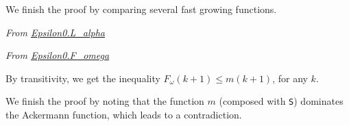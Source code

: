 We finish the proof by comparing several fast growing functions.

\vspace{4pt}

\emph{From \href{../theories/html/hydras.Epsilon0.L_alpha.html}{Epsilon0.L\_alpha}}



\vspace{4pt}

\emph{From \href{../theories/html/hydras.Epsilon0.F_omega.html}{Epsilon0.F\_omega}}


\vspace{4pt}

By transitivity, we get the inequality
$F_\omega(k+1)\leq m(k+1)$, for any $k$.




We finish the proof by noting that the function $m$ (composed with \texttt{S}) dominates the Ackermann function, which leads to a contradiction.





\vspace{4pt}






